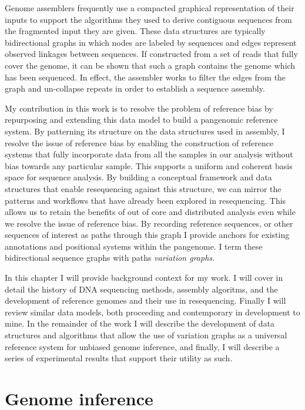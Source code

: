Genome assemblers frequently use a compacted graphical representation of their inputs to support the algorithms they used to derive contiguous sequences from the fragmented input they are given.
These data structures are typically bidirectional graphs in which nodes are labeled by sequences and edges represent observed linkages between sequences.
If constructed from a set of reads that fully cover the genome, it can be shown that such a graph contains the genome which has been sequenced.
In effect, the assembler works to filter the edges from the graph and un-collapse repeats in order to establish a sequence assembly.

My contribution in this work is to resolve the problem of reference bias by repurposing and extending this data model to build a pangenomic reference system.
By patterning its structure on the data structures used in assembly, I resolve the issue of reference bias by enabling the construction of reference systems that fully incorporate data from all the samples in our analysis without bias towards any particular sample.
This supports a uniform and coherent basis space for sequence analysis.
By building a conceptual framework and data structures that enable resequencing against this structure, we can mirror the patterns and workflows that have already been explored in resequencing.
This allows us to retain the benefits of out of core and distributed analysis even while we resolve the issue of reference bias.
By recording reference sequences, or other sequences of interest as paths through this graph I provide anchors for existing annotations and positional systems within the pangenome.
I term these bidirectional sequence graphs with paths \emph{variation graphs}.

In this chapter I will provide background context for my work.
I will cover in detail the history of DNA sequencing methods, assembly algoritms, and the development of reference genomes and their use in resequencing.
Finally I will review similar data models, both proceeding and contemporary in development to mine.
In the remainder of the work I will describe the development of data structures and algorithms that allow the use of variation graphs as a universal reference system for unbiased genome inference, and finally, I will describe a series of experimental results that support their utility as such.

\section{Genome inference}

